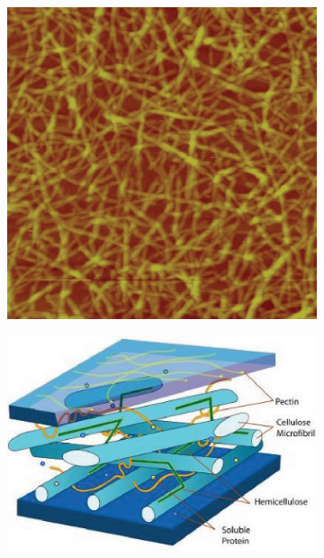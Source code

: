 \ClearMyMinHeight
{}

\begin{figure}\centering%
\begin{subfigure}{0.32\linewidth}\centering
    \includegraphics[height=\myMinHeight]{../../img/AFM_Innventia_nanocellulose}
    \caption{}\label{fig:cellulose}
\end{subfigure}\hfill%
\begin{subfigure}{0.32\linewidth}\centering
    \includegraphics[height=\myMinHeight]{../../img/crosslink}

\end{subfigure}
\end{figure}
